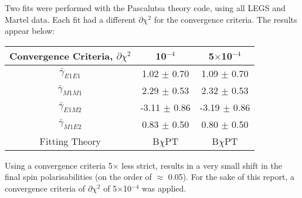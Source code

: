 \documentclass[]{article}
\begin{document}
\noindent Two fits were performed with the Pascalutsa theory code, using all LEGS and Martel data. Each fit had a different $\partial\chi^{2}$ for the convergence criteria. The results appear below:
 
\begin{table}[h!]
	\centering %
	\begin{tabular}{|c|c|c|} %
		\hline
		Convergence Criteria, $\partial\chi^{2}$ & 10$^{-4}$ & 5$\times$10$^{-4}$ \\
		\hline %
		$\bar{\gamma}_{E1E1}$ & 1.02 $\pm$ 0.70 & 1.09 $\pm$ 0.70 \\ 
		$\bar{\gamma}_{M1M1}$ & 2.29 $\pm$ 0.53 & 2.32 $\pm$ 0.53 \\
		$\bar{\gamma}_{E1M2}$ & -3.11 $\pm$ 0.86 & -3.19 $\pm$ 0.86 \\
		$\bar{\gamma}_{M1E2}$ & 0.83 $\pm$ 0.50 & 0.80 $\pm$ 0.50 \\[0.5ex]
		\hline
		Fitting Theory & B$\chi$PT & B$\chi$PT\\
		\hline
	\end{tabular}
\end{table}

\noindent Using a convergence criteria 5$\times$ less strict, results in a very small shift in the final spin polarisabilities (on the order of $\approx$ 0.05). For the sake of this report, a convergence criteria of $\partial\chi^{2}$ of 5$\times$10$^{-4}$ was applied.
\end{document}
